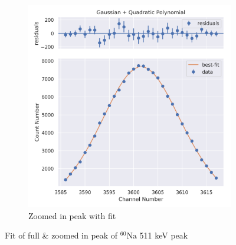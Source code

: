 \documentclass[11pt,a4paper]{article}
\newcommand{\element}[2]{$^{#2}\textrm{#1}$}
\begin{document}
\begin{figure}[H]
\begin{subfigure}{.5\linewidth}
    \includegraphics[width=\linewidth]{./Images/Sodium22/Quad/Quad_1_Zoom.png}
    \caption{Zoomed in peak with fit}
  \end{subfigure}
  \caption{Fit of full \& zoomed in peak of \element{Na}{60} 511 keV peak}
\end{figure}
\end{document}
